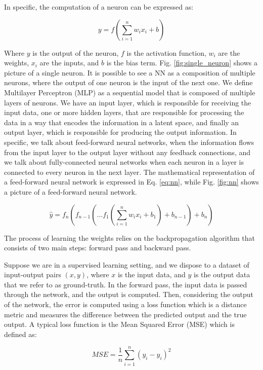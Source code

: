 In specific, the computation of a neuron can be expressed as:

\begin{equation}
    y = f(\sum_{i=1}^{n} w_i x_i + b)\label{eq:neuron}
\end{equation}

Where $y$ is the output of the neuron, $f$ is the activation function, $w_i$ are the weights, $x_i$ are the inputs, and $b$ is the bias term.
Fig. \ref{fig:single_neuron} shows a picture of a single neuron.
It is possible to see a NN as a composition of multiple neurons, where the output of one neuron is the input of the next one.
We define Multilayer Perceptron (MLP) as a sequential model that is composed of multiple layers of neurons.
We have an input layer, which is responsible for receiving the input data, one or more hidden layers, that are responsible for processing the data in a way that encodes the information in a latent space, and finally an output layer, which is responsible for producing the output information.
In specific, we talk about feed-forward neural networks, when the information flows from the input layer to the output layer without any feedback connections, and we talk about fully-connected neural networks when each neuron in a layer is connected to every neuron in the next layer.
The mathematical representation of a feed-forward neural network is expressed in Eq. \ref{eq:nn}, while Fig. \ref{fig:nn} shows a picture of a feed-forward neural network.

\begin{equation}
    \hat{y} = f_n(f_{n-1}(\dots f_1(\sum_{i=1}^{n} w_i x_i + b_1) + b_{n-1}) + b_n)\label{eq:nn}
\end{equation}


The process of learning the weights relies on the backpropagation algorithm that consists of two main steps: forward pass and backward pass.

Suppose we are in a supervised learning setting, and we dispose to a dataset of input-output pairs $(x, y)$, where $x$ is the input data, and $y$ is the output data that we refer to as ground-truth.
In the forward pass, the input data is passed through the network, and the output \textit{} is computed.
Then, considering the output of the network, the error is computed using a loss function which is a distance metric and measures the difference between the predicted output and the true output.
A typical loss function is the Mean Squared Error (MSE) which is defined as:

\begin{equation}
    MSE = \frac{1}{n} \sum_{i=1}^{n} (y_i - \hat{y}_i)^2
\end{equation}


